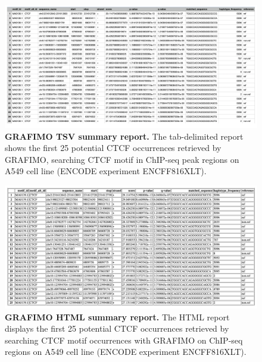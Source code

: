\documentclass[a4paper, titlepage, openright]{book}
\newcommand{\grafimo}{GRAFIMO\xspace}
\begin{document}
\begin{figure}
    \centering
    \includegraphics[width=\textwidth]{figures/grafimo-tsv-report.png}
    \caption[\grafimo TSV summary report]{\textbf{\grafimo TSV summary report.} The tab-delimited report shows the first 25 potential CTCF occurrences retrieved by \grafimo, searching CTCF motif in ChIP-seq peak regions on A549 cell line (ENCODE experiment ENCFF816XLT).}
    \label{fig:grafimo-tsv}
\end{figure}

\begin{figure}
    \centering
    \includegraphics[width=\textwidth]{figures/grafimo-html.png}
    \caption[\grafimo HTML summary report]{\textbf{\grafimo HTML summary report.} The HTML report displays the first 25 potential CTCF occurrences retrieved by searching CTCF motif occurrences with \grafimo on ChIP-seq regions on A549 cell line (ENCODE experiment ENCFF816XLT).}
    \label{fig:grafimo-html}
\end{figure}
\end{document}
